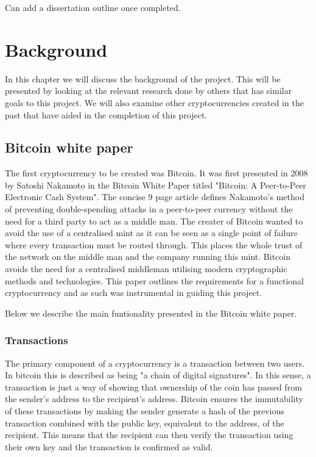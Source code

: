 \documentclass{l4proj}
\begin{document}
Can add a dissertation outline once completed.



\chapter{Background}
In this chapter we will discuss the background of the project. This will be presented by looking at the relevant research done by 
others that has similar goals to this project. We will also examine other cryptocurrencies created in the past that have aided 
in the completion of this project.


\section{Bitcoin white paper}
The first cryptocurrency to be created was Bitcoin. It was first presented in 2008 by Satoshi Nakamoto in the Bitcoin White Paper
titled "Bitcoin: A Peer-to-Peer Electronic Cash System". The concise 9 page article defines Nakamoto's method of preventing
double-spending attacks in a peer-to-peer currency without the need for a third party to act as a middle man. The creater
of Bitcoin wanted to avoid the use of a centralised mint as it can be seen as a single point of failure where every transaction
must be routed through. This places the whole trust of the network on the middle man and the company running this mint. 
Bitcoin avoids the need for a centralised middleman utilising modern cryptographic methods and technologies. This paper 
outlines the requirements for a functional cryptocurrency and as such was instrumental in guiding this project.

Below we describe the main funtionality presented in the Bitcoin white paper.


\subsection{Transactions}
The primary component of a cryptocurrency is a transaction between two users. In bitcoin this is described as being "a
chain of digital signatures". In this sense, a transaction is just a way of showing that ownership of the coin has
passed from the sender's address to the recipient's address. Bitcoin ensures the immutability of these transactions
by making the sender generate a hash of the previous transaction combined with the public key, equivalent to the address,
of the recipient. This means that the recipient can then verify the transaction using their own key and the transaction
is confirmed as valid.
\end{document}
